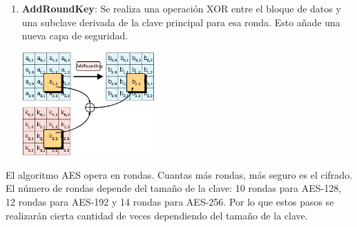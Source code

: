 \documentclass[a4paper, 12pt]{article}
\begin{document}
\begin{enumerate}
\item \textbf{AddRoundKey}: Se realiza una operación XOR entre el bloque de datos y una subclave derivada de la clave principal para esa ronda. Esto añade una nueva capa de seguridad.

\begin{center}
  \includegraphics[width=0.4\textwidth]{images/AddRoundKey.png}
\end{center}

\end{enumerate}

El algoritmo AES opera en rondas. Cuantas más rondas, más seguro es el cifrado. El número de rondas depende del tamaño de la clave: 10 rondas para AES-128, 12 rondas para AES-192 y 14 rondas para AES-256. Por lo que estos pasos se realizarán cierta cantidad de veces dependiendo del tamaño de la clave.
\end{document}
